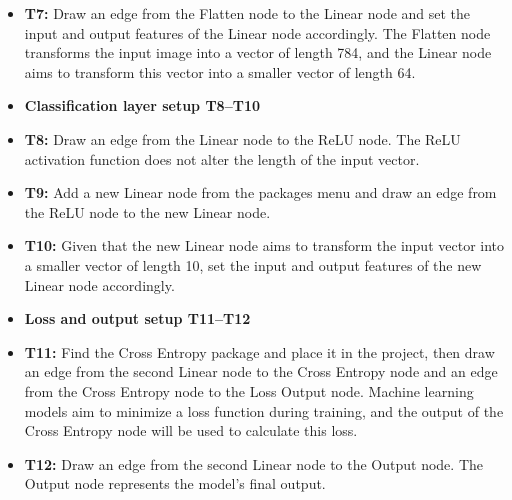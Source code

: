 \documentclass[10pt,a4paper]{article}
\newcommand{\taskgroup}[2]{%
    \item[] {\color{groupcolor}\small\bfseries
    #1 \hfill \normalfont\footnotesize #2}%
}
\begin{document}
\begin{minipage}[t]{0.48\textwidth}
\begin{itemize}
    \item \textbf{T7:} Draw an edge from the Flatten node to the Linear node and set the input and output features of the Linear node accordingly. The Flatten node transforms the input image into a vector of length 784, and the Linear node aims to transform this vector into a smaller vector of length 64.

    \taskgroup{Classification layer setup}{T8--T10}

    \item \textbf{T8:} Draw an edge from the Linear node to the ReLU node. The ReLU activation function does not alter the length of the input vector.

    \item \textbf{T9:} Add a new Linear node from the packages menu and draw an edge from the ReLU node to the new Linear node.

    \item \textbf{T10:} Given that the new Linear node aims to transform the input vector into a smaller vector of length 10, set the input and output features of the new Linear node accordingly.

    \taskgroup{Loss and output setup}{T11--T12}

    \item \textbf{T11:} Find the Cross Entropy package and place it in the project, then draw an edge from the second Linear node to the Cross Entropy node and an edge from the Cross Entropy node to the Loss Output node. Machine learning models aim to minimize a loss function during training, and the output of the Cross Entropy node will be used to calculate this loss.

    \item \textbf{T12:} Draw an edge from the second Linear node to the Output node. The Output node represents the model’s final output.
\end{itemize}

\end{minipage}
\hfill
\end{document}
